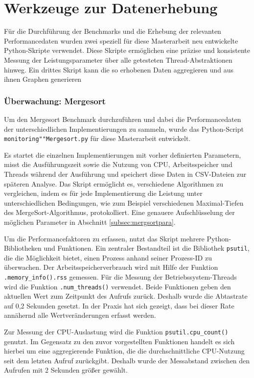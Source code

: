 \documentclass[fontsize=12pt,paper=a4,twoside=semi,parskip=half-,headsepline,headinclude]{scrreprt}
\begin{document}
\section{Werkzeuge zur Datenerhebung}

Für die Durchführung der Benchmarks und die Erhebung der relevanten Performancedaten wurden zwei speziell für diese Masterarbeit neu entwickelte Python-Skripte verwendet. Diese Skripte ermöglichen eine präzise und konsistente Messung der Leistungsparameter über alle getesteten Thread-Abstraktionen hinweg. Ein drittes Skript kann die so erhobenen Daten aggregieren und aus ihnen Graphen generieren

\subsubsection{Überwachung: Mergesort}

Um den Mergesort Benchmark durchzuführen und dabei die Performancedaten der unterschiedlichen Implementierungen zu sammeln, wurde das Python-Script \texttt{monitoring""Mergesort.py} für diese Masterarbeit entwickelt.

Es startet die einzelnen Implementierungen mit vorher definierten Parametern, misst die Ausführungszeit sowie die Nutzung von CPU, Arbeitsspeicher und Threads während der Ausführung und speichert diese Daten in CSV-Dateien zur späteren Analyse. Das Skript ermöglicht es, verschiedene Algorithmen zu vergleichen, indem es für jede Implementierung die Leistung unter unterschiedlichen Bedingungen, wie zum Beispiel verschiedenen Maximal-Tiefen des MergeSort-Algorithmus, protokolliert. Eine genauere Aufschlüsselung der möglichen Parameter in Abschnitt \ref{subsec:mergsortpara}.

Um die Performancefaktoren zu erfassen, nutzt das Skript mehrere Python-Bibliotheken und Funktionen. Ein zentraler Bestandteil ist die Bibliothek \texttt{psutil}, die die Möglichkeit bietet, einen Prozess anhand seiner Prozess-ID zu überwachen. Der Arbeitsspeicherverbrauch wird mit Hilfe der Funktion \texttt{.memory\_info().rss} gemessen. Für die Messung der Betriebssystem-Threads wird die Funktion \texttt{.num\_threads()} verwendet. Beide Funktionen geben den aktuellen Wert zum Zeitpunkt des Aufrufs zurück. Deshalb wurde die Abtastrate auf 0,2 Sekunden gesetzt. In der Praxis hat sich gezeigt, dass bei dieser Rate annähernd alle Wertveränderungen erfasst werden.

Zur Messung der CPU-Auslastung wird die Funktion \texttt{psutil.cpu\_count()} genutzt. Im Gegensatz zu den zuvor vorgestellten Funktionen handelt es sich hierbei um eine aggregierende Funktion, die die durchschnittliche CPU-Nutzung seit dem letzten Aufruf zurückgibt. Deshalb wurde der Messabstand zwischen den Aufrufen mit 2 Sekunden größer gewählt.
\end{document}
